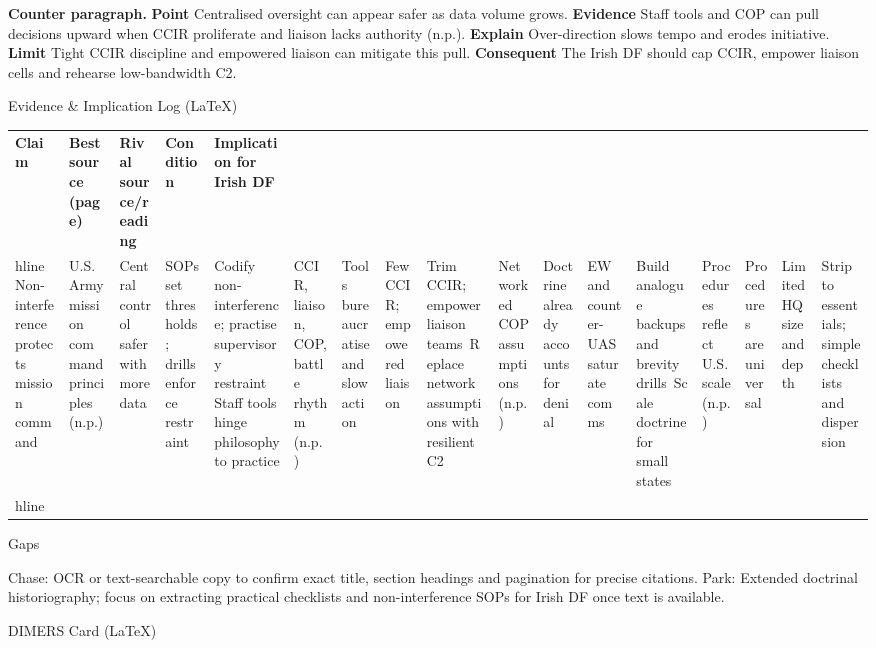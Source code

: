 \textbf{Counter paragraph.}
\textbf{Point} Centralised oversight can appear safer as data volume grows.
\textbf{Evidence} Staff tools and COP can pull decisions upward when CCIR proliferate and liaison lacks authority (n.p.).
\textbf{Explain} Over-direction slows tempo and erodes initiative.
\textbf{Limit} Tight CCIR discipline and empowered liaison can mitigate this pull. \textbf{Consequent} The Irish DF should cap CCIR, empower liaison cells and rehearse low-bandwidth C2.

Evidence & Implication Log (LaTeX)

\usepackage{array}

\begin{tabular}{p{3.2cm}p{4.2cm}p{3.6cm}p{3.2cm}p{4.2cm}}
	\textbf{Claim} & \textbf{Best source (page)} & \textbf{Rival source/reading} & \textbf{Condition} & \textbf{Implication for Irish DF}\\hline
	Non-interference protects mission command & U.S. Army mission command principles (n.p.) & Central control safer with more data & SOPs set thresholds; drills enforce restraint & Codify non-interference; practise supervisory restraint\
	Staff tools hinge philosophy to practice & CCIR, liaison, COP, battle rhythm (n.p.) & Tools bureaucratise and slow action & Few CCIR; empowered liaison & Trim CCIR; empower liaison teams\
	Replace network assumptions with resilient C2 & Networked COP assumptions (n.p.) & Doctrine already accounts for denial & EW and counter-UAS saturate comms & Build analogue backups and brevity drills\
	Scale doctrine for small states & Procedures reflect U.S. scale (n.p.) & Procedures are universal & Limited HQ size and depth & Strip to essentials; simple checklists and dispersion\\hline
\end{tabular}

Gaps

Chase: OCR or text-searchable copy to confirm exact title, section headings and pagination for precise citations.
Park: Extended doctrinal historiography; focus on extracting practical checklists and non-interference SOPs for Irish DF once text is available.

\parencite{BRASHER_2005}

DIMERS Card (LaTeX)

